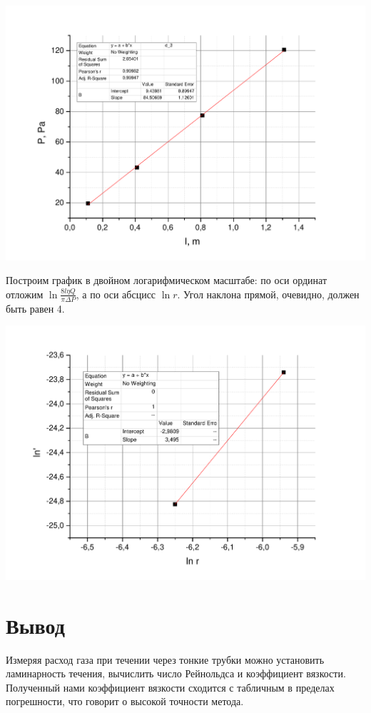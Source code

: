 \documentclass[a4paper,12pt]{article}
\begin{document}
	\includegraphics[width = 0.9\linewidth]{Graph4}
	
	
	Построим график в двойном логарифмическом масштабе: по оси ординат отложим $\ln \frac{8l\eta Q}{\pi\Delta P}$, а по оси абсцисс $\ln r$. Угол наклона прямой, очевидно, должен быть равен 4.
	
	\includegraphics[width = 0.9\linewidth]{Graph5}
	\section{Вывод}
		Измеряя расход газа при течении через тонкие трубки можно установить ламинарность течения, вычислить число Рейнольдса и коэффициент вязкости. Полученный нами коэффициент вязкости сходится с табличным в пределах погрешности, что говорит о высокой точности метода.
\end{document}
